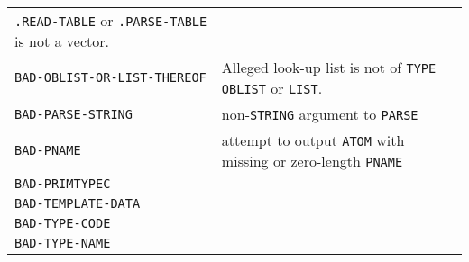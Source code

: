 \documentclass[a4paper,]{article}
\begin{document}
\begin{longtable}[]{@{}ll@{}}
\begin{minipage}[t]{0.36\columnwidth}
\texttt{.READ-TABLE} or \texttt{.PARSE-TABLE} is not a vector.\strut
\end{minipage}\tabularnewline
\begin{minipage}[t]{0.58\columnwidth}\raggedright\strut
\texttt{BAD-OBLIST-OR-LIST-THEREOF}\strut
\end{minipage} & \begin{minipage}[t]{0.36\columnwidth}\raggedright\strut
Alleged look-up list is not of \texttt{TYPE} \texttt{OBLIST} or \texttt{LIST}.\strut
\end{minipage}\tabularnewline
\begin{minipage}[t]{0.58\columnwidth}\raggedright\strut
\texttt{BAD-PARSE-STRING}\strut
\end{minipage} & \begin{minipage}[t]{0.36\columnwidth}\raggedright\strut
non-\texttt{STRING} argument to \texttt{PARSE}\strut
\end{minipage}\tabularnewline
\begin{minipage}[t]{0.58\columnwidth}\raggedright\strut
\texttt{BAD-PNAME}\strut
\end{minipage} & \begin{minipage}[t]{0.36\columnwidth}\raggedright\strut
attempt to output \texttt{ATOM} with missing or zero-length \texttt{PNAME}\strut
\end{minipage}\tabularnewline
\begin{minipage}[t]{0.58\columnwidth}\raggedright\strut
\texttt{BAD-PRIMTYPEC}\strut
\end{minipage} & \begin{minipage}[t]{0.36\columnwidth}\raggedright\strut
\strut
\end{minipage}\tabularnewline
\begin{minipage}[t]{0.58\columnwidth}\raggedright\strut
\texttt{BAD-TEMPLATE-DATA}\strut
\end{minipage} & \begin{minipage}[t]{0.36\columnwidth}\raggedright\strut
\strut
\end{minipage}\tabularnewline
\begin{minipage}[t]{0.58\columnwidth}\raggedright\strut
\texttt{BAD-TYPE-CODE}\strut
\end{minipage} & \begin{minipage}[t]{0.36\columnwidth}\raggedright\strut
\strut
\end{minipage}\tabularnewline
\begin{minipage}[t]{0.58\columnwidth}\raggedright\strut
\texttt{BAD-TYPE-NAME}\strut

\end{minipage}
\end{longtable}
\end{document}
